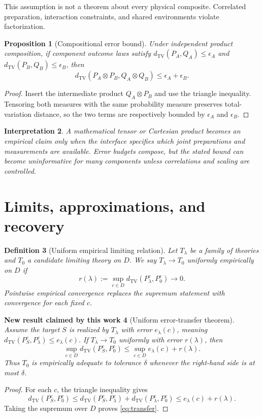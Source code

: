 \documentclass[11pt]{article}
\newtheorem{definition}{Definition}[section]
\newtheorem{proposition}[definition]{Proposition}
\newtheorem{interpretation}[definition]{Interpretation}
\newtheorem{newresult}[definition]{New result claimed by this work}
\newcommand{\TV}{d_{\mathrm{TV}}}
\begin{document}
This assumption is not a theorem about every physical composite.  Correlated preparation, interaction constraints, and shared environments violate factorization.

\begin{proposition}[Compositional error bound]
Under independent product composition, if component outcome laws satisfy $\TV(P_A,Q_A)\leq\epsilon_A$ and $\TV(P_B,Q_B)\leq\epsilon_B$, then
\[
 \TV(P_A\otimes P_B,Q_A\otimes Q_B)\leq\epsilon_A+\epsilon_B.
\]
\end{proposition}
\begin{proof}
Insert the intermediate product $Q_A\otimes P_B$ and use the triangle inequality.  Tensoring both measures with the same probability measure preserves total-variation distance, so the two terms are respectively bounded by $\epsilon_A$ and $\epsilon_B$.
\end{proof}

\begin{interpretation}
A mathematical tensor or Cartesian product becomes an empirical claim only when the interface specifies which joint preparations and measurements are available.  Error budgets compose, but the stated bound can become uninformative for many components unless correlations and scaling are controlled.
\end{interpretation}

\section{Limits, approximations, and recovery}

\begin{definition}[Uniform empirical limiting relation]
Let $T_\lambda$ be a family of theories and $T_0$ a candidate limiting theory on $D$.  We say $T_\lambda\to T_0$ uniformly empirically on $D$ if
\[
 r(\lambda):=\sup_{c\in D}\TV(P_\lambda^c,P_0^c)\longrightarrow0.
\]
Pointwise empirical convergence replaces the supremum statement with convergence for each fixed $c$.
\end{definition}

\begin{newresult}[Uniform error-transfer theorem]
Assume the target $S$ is realized by $T_\lambda$ with error $e_\lambda(c)$, meaning $\TV(P_S^c,P_\lambda^c)\leq e_\lambda(c)$.  If $T_\lambda\to T_0$ uniformly with error $r(\lambda)$, then
\begin{equation}\label{eq:transfer}
 \sup_{c\in D}\TV(P_S^c,P_0^c)
 \leq \sup_{c\in D}e_\lambda(c)+r(\lambda).
\end{equation}
Thus $T_0$ is empirically adequate to tolerance $\delta$ whenever the right-hand side is at most $\delta$.
\end{newresult}
\begin{proof}
For each $c$, the triangle inequality gives
\[
 \TV(P_S^c,P_0^c)\leq\TV(P_S^c,P_\lambda^c)+\TV(P_\lambda^c,P_0^c)
 \leq e_\lambda(c)+r(\lambda).
\]
Taking the supremum over $D$ proves \eqref{eq:transfer}.
\end{proof}
\end{document}
